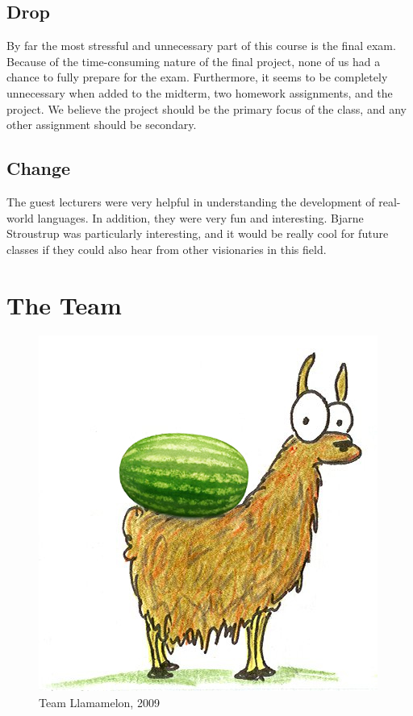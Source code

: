 \subsection{Drop}
By far the most stressful and unnecessary part of this course is the
final exam. Because of the time-consuming nature of the final project,
none of us had a chance to fully prepare for the exam. Furthermore, it
seems to be completely unnecessary when added to the midterm, two
homework assignments, and the project. We believe the project should
be the primary focus of the class, and any other assignment should be
secondary.
\subsection{Change}
The guest lecturers were very helpful in understanding the development
of real-world languages. In addition, they were very fun and
interesting. Bjarne Stroustrup was particularly interesting, and it
would be really cool for future classes if they could also hear from
other visionaries in this field.

\pagebreak
\section{The Team}
\begin{figure}[htp]
\centering
\includegraphics[scale=0.75]{lm.jpg}
\caption{Team Llamamelon, 2009}\label{llamamelon}
\end{figure}
